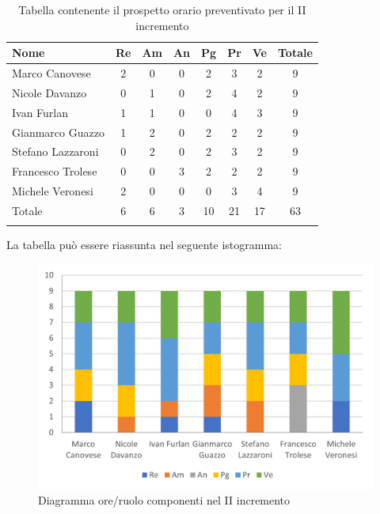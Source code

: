 \begin{longtable}{|l|c|c|c|c|c|c|c|}
	\hline
	\rowcolor{lighter-grayer}
	\textbf{Nome}     & \textbf{Re} & \textbf{Am} & \textbf{An} & \textbf{Pg} & \textbf{Pr} & \textbf{Ve} & \textbf{Totale} \\
	\hline
	\endfirsthead

	\hline
	Marco Canovese    & 2           & 0           & 0           & 2           & 3           & 2           & 9               \\
	\hline
	\hline
	Nicole Davanzo    & 0           & 1           & 0           & 2           & 4           & 2           & 9               \\
	\hline
	\hline
	Ivan Furlan       & 1           & 1           & 0           & 0           & 4           & 3           & 9               \\
	\hline
	\hline
	Gianmarco Guazzo  & 1           & 2           & 0           & 2           & 2           & 2           & 9               \\
	\hline
	\hline
	Stefano Lazzaroni & 0           & 2           & 0           & 2           & 3           & 2           & 9               \\
	\hline
	\hline
	Francesco Trolese & 0           & 0           & 3           & 2           & 2           & 2           & 9               \\
	\hline
	\hline
	Michele Veronesi  & 2           & 0           & 0           & 0           & 3           & 4           & 9               \\
	\hline
	\hline
	Totale            & 6           & 6          & 3          & 10           & 21           & 17          & 63              \\
	\hline
	\rowcolor{white}
	\caption{Tabella contenente il prospetto orario preventivato per il II incremento}
\end{longtable}


La tabella può essere riassunta nel seguente istogramma:

\begin{figure}[H]
	\centering
	\includegraphics[width=0.8\linewidth]{res/images/preventivo/dettaglio_poc/2-1.png}
	\caption{Diagramma ore/ruolo componenti nel II incremento}
	\label{fig:diagramma suddivisione ruoli II incremento}
\end{figure}

